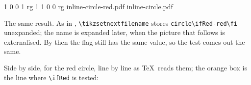\documentclass[11pt,a4paper]{article}
\newif\ifRed  %
\newcommand{\cs}[1]{\texttt{\textbackslash #1}}
\newcommand{\flagif}[1]{\texttt{\lstflagif{#1}{}}}
\newcommand{\lstflagif}[2]{{\color{orange!85!black}\textbackslash if}{\color{teal!80!black}#1}}
\begin{document}
\begin{cmdout}
   1 0 0 1 rg
   1 1 0 0 rg
inline-circle-red.pdf
inline-circle.pdf
\end{cmdout}

The same result. As in , \cs{tikzsetnextfilename} stores \verb|circle\ifRed-red\fi| unexpanded; the name is expanded later, when the picture that follows is externalised. By then the flag still has the same value, so the test comes out the same.

Side by side, for the red circle, line by line as \TeX\ reads them; the orange box is the line where \flagif{Red} is tested:
\end{document}
